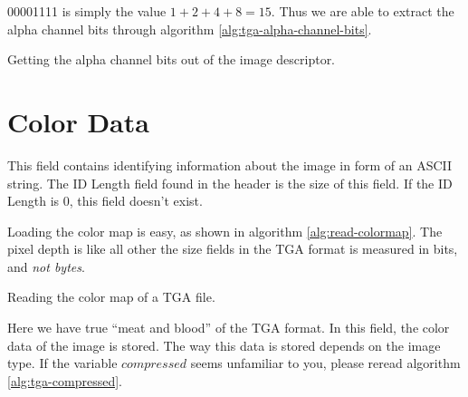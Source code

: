   00001111 is simply the value $1 + 2 + 4 + 8 = 15$. Thus we are able
  to extract the alpha channel bits through algorithm
  \ref{alg:tga-alpha-channel-bits}.

  \begin{algorithm}[H]
    \caption{Getting the alpha channel bits out of the image descriptor.}
    \label{alg:tga-alpha-channel-bits}
    \begin{algorithmic}[1]
    \end{algorithmic}
  \end{algorithm}

  \section{Color Data}
  \label{sec:color-data}


  This field contains identifying information about the image in form
  of an ASCII string. The ID Length field found in the header is the
  size of this field. If the ID Length is 0, this field doesn't
  exist.


  Loading the color map is easy, as shown in algorithm
  \ref{alg:read-colormap}. The pixel depth is like all other the size
  fields in the TGA format is measured in bits, and \textit{not bytes}.

  \begin{algorithm}[H]
    \caption{Reading the color map of a TGA file.}
    \label{alg:read-colormap}
    \begin{algorithmic}[1]
      \State {}
      \EndFor
    \end{algorithmic}
  \end{algorithm}


  Here we have true ``meat and blood'' of the TGA format. In this
  field, the color data of the image is stored. The way this data is
  stored depends on the image type. If the variable $compressed$ seems
  unfamiliar to you, please reread algorithm \ref{alg:tga-compressed}.

